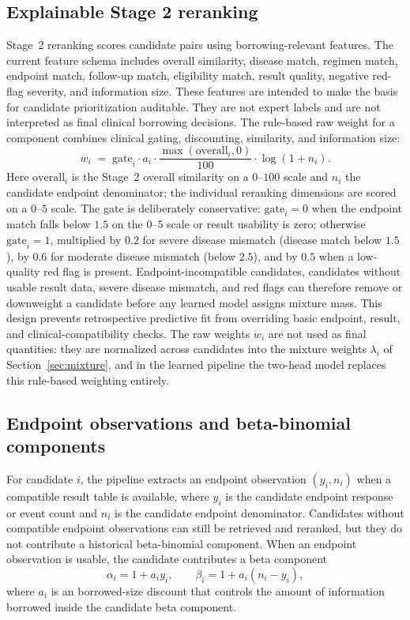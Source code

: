 \documentclass[11pt]{article}
\begin{document}
\subsection{Explainable Stage 2 reranking}
\label{sec:rerank}
Stage~2 reranking scores candidate pairs using borrowing-relevant features.
The current feature schema includes overall similarity, disease match, regimen
match, endpoint match, follow-up match, eligibility match, result quality,
negative red-flag severity, and information size. These features are intended
to make the basis for candidate prioritization auditable. They are not expert
labels and are not interpreted as final clinical borrowing decisions. The
rule-based raw weight for a component combines clinical gating, discounting,
similarity, and information size:
\begin{equation}
w_i \;=\; \mathrm{gate}_i \cdot a_i \cdot \frac{\max(\mathrm{overall}_i,0)}{100}
\cdot \log(1+n_i).
\end{equation}
Here $\mathrm{overall}_i$ is the Stage~2 overall similarity on a $0$--$100$
scale and $n_i$ the candidate endpoint denominator; the individual reranking
dimensions are scored on a $0$--$5$ scale. The gate is deliberately
conservative: $\mathrm{gate}_i = 0$ when the endpoint match falls below $1.5$
on the $0$--$5$ scale or result usability is zero; otherwise
$\mathrm{gate}_i = 1$, multiplied by $0.2$ for severe disease mismatch (disease
match below $1.5$), by $0.6$ for moderate disease mismatch (below $2.5$), and
by $0.5$ when a low-quality red flag is present. Endpoint-incompatible
candidates, candidates without usable result data, severe disease mismatch, and
red flags can therefore remove or downweight a candidate before any learned
model assigns mixture mass. This design prevents retrospective predictive fit
from overriding basic endpoint, result, and clinical-compatibility checks. The
raw weights $w_i$ are not used as final quantities: they are normalized across
candidates into the mixture weights $\lambda_i$ of
Section~\ref{sec:mixture}, and in the learned pipeline the two-head model
replaces this rule-based weighting entirely.

\subsection{Endpoint observations and beta-binomial components}
For candidate $i$, the pipeline extracts an endpoint observation
$(y_i,n_i)$ when a compatible result table is available, where $y_i$ is the
candidate endpoint response or event count and $n_i$ is the candidate endpoint
denominator. Candidates without compatible endpoint observations can still be
retrieved and reranked, but they do not contribute a historical beta-binomial
component. When an endpoint observation is usable, the candidate contributes a
beta component
\begin{equation}
\alpha_i = 1 + a_i y_i, \qquad
\beta_i  = 1 + a_i (n_i - y_i),
\end{equation}
where $a_i$ is an borrowed-size discount that controls the amount of
information borrowed inside the candidate beta component.
\end{document}
